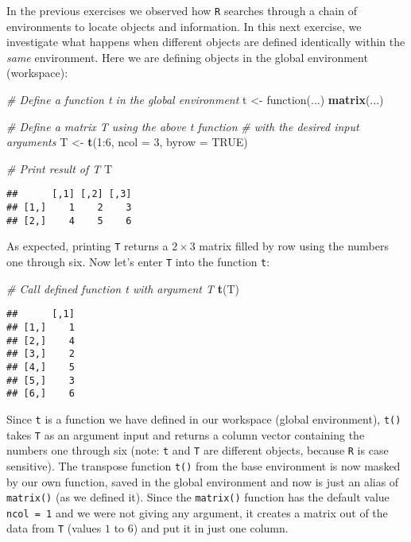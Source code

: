 \documentclass[11,]{article}
\newenvironment{Shaded}{\begin{snugshade}}{\end{snugshade}}
\newcommand{\KeywordTok}[1]{\textcolor[rgb]{0.13,0.29,0.53}{\textbf{{#1}}}}
\newcommand{\DataTypeTok}[1]{\textcolor[rgb]{0.13,0.29,0.53}{{#1}}}
\newcommand{\DecValTok}[1]{\textcolor[rgb]{0.00,0.00,0.81}{{#1}}}
\newcommand{\StringTok}[1]{\textcolor[rgb]{0.31,0.60,0.02}{{#1}}}
\newcommand{\CommentTok}[1]{\textcolor[rgb]{0.56,0.35,0.01}{\textit{{#1}}}}
\newcommand{\OtherTok}[1]{\textcolor[rgb]{0.56,0.35,0.01}{{#1}}}
\newcommand{\NormalTok}[1]{{#1}}
\begin{document}
In the previous exercises we observed how \texttt{R} searches through a
chain of environments to locate objects and information. In this next
exercise, we investigate what happens when different objects are defined
identically within the \emph{same} environment. Here we are defining
objects in the global environment (workspace):

\begin{Shaded}
\begin{Highlighting}[]
\CommentTok{# Define a function t in the global environment}
\NormalTok{t <-}\StringTok{ }\NormalTok{function(...) }\KeywordTok{matrix}\NormalTok{(...)}

\CommentTok{# Define a matrix T using the above t function}
\CommentTok{# with the desired input arguments}
\NormalTok{T <-}\StringTok{ }\KeywordTok{t}\NormalTok{(}\DecValTok{1}\NormalTok{:}\DecValTok{6}\NormalTok{, }\DataTypeTok{ncol =} \DecValTok{3}\NormalTok{, }\DataTypeTok{byrow =} \OtherTok{TRUE}\NormalTok{)}

\CommentTok{# Print result of T}
\NormalTok{T}
\end{Highlighting}
\end{Shaded}

\begin{verbatim}
##      [,1] [,2] [,3]
## [1,]    1    2    3
## [2,]    4    5    6
\end{verbatim}

As expected, printing \texttt{T} returns a \(2 \times 3\) matrix filled
by row using the numbers one through six. Now let's enter \texttt{T}
into the function \texttt{t}:

\begin{Shaded}
\begin{Highlighting}[]
\CommentTok{# Call defined function t with argument T}
\KeywordTok{t}\NormalTok{(T)}
\end{Highlighting}
\end{Shaded}

\begin{verbatim}
##      [,1]
## [1,]    1
## [2,]    4
## [3,]    2
## [4,]    5
## [5,]    3
## [6,]    6
\end{verbatim}

Since \texttt{t} is a function we have defined in our workspace (global
environment), \texttt{t()} takes \texttt{T} as an argument input and
returns a column vector containing the numbers one through six (note:
\texttt{t} and \texttt{T} are different objects, because \texttt{R} is
case sensitive). The transpose function \texttt{t()} from the base
environment is now masked by our own function, saved in the global
environment and now is just an alias of \texttt{matrix()} (as we defined
it). Since the \texttt{matrix()} function has the default value
\texttt{ncol\ =\ 1} and we were not giving any argument, it creates a
matrix out of the data from \texttt{T} (values \(1\) to \(6\)) and put
it in just one column.
\end{document}
